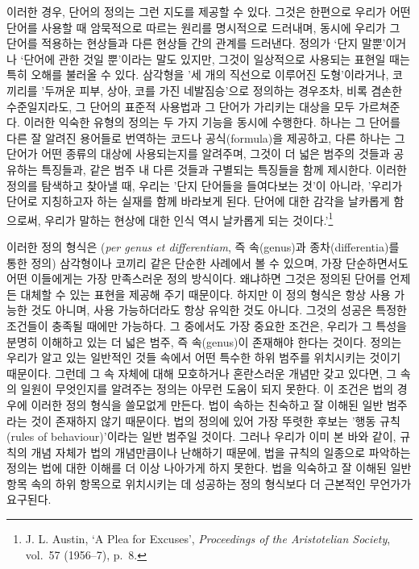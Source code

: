 \documentclass[12pt, oneside]{book}  %
\begin{document}
이러한 경우, 단어의 정의는 그런 지도를 제공할 수 있다. 그것은 한편으로
우리가 어떤 단어를 사용할 때 암묵적으로 따르는 원리를 명시적으로
드러내며, 동시에 우리가 그 단어를 적용하는 현상들과 다른 현상들 간의
관계를 드러낸다. 정의가 `단지 말뿐'이거나 `단어에 관한 것일 뿐'이라는
말도 있지만, 그것이 일상적으로 사용되는 표현일 때는 특히 오해를 불러올
수 있다. 삼각형을 '세 개의 직선으로 이루어진 도형'이라거나, 코끼리를
'두꺼운 피부, 상아, 코를 가진 네발짐승'으로 정의하는 경우조차, 비록
겸손한 수준일지라도, 그 단어의 표준적 사용법과 그 단어가 가리키는 대상을
모두 가르쳐준다. 이러한 익숙한 유형의 정의는 두 가지 기능을 동시에
수행한다. 하나는 그 단어를 다른 잘 알려진 용어들로 번역하는 코드나
공식(formula)을 제공하고, 다른 하나는 그 단어가 어떤 종류의 대상에
사용되는지를 알려주며, 그것이 더 넓은 범주의 것들과 공유하는 특징들과,
같은 범주 내 다른 것들과 구별되는 특징들을 함께 제시한다. 이러한 정의를
탐색하고 찾아낼 때, 우리는 '단지 단어들을 들여다보는 것'이 아니라,
'우리가 단어로 지칭하고자 하는 실재를 함께 바라보게 된다. 단어에 대한
감각을 날카롭게 함으로써, 우리가 말하는 현상에 대한 인식 역시 날카롭게
되는 것이다.'\footnote{J. L. Austin, `A Plea for Excuses',
  \emph{Proceedings of the Aristotelian Society}, vol.~57 (1956--7),
  p.~8.}

이러한 정의 형식은 (\emph{per genus et differentiam}, 즉 속(genus)과
종차(differentia)를 통한 정의) 삼각형이나 코끼리 같은 단순한 사례에서 볼
수 있으며, 가장 단순하면서도 어떤 이들에게는 가장 만족스러운 정의
방식이다. 왜냐하면 그것은 정의된 단어를 언제든 대체할 수 있는 표현을
제공해 주기 때문이다. 하지만 이 정의 형식은 항상 사용 가능한 것도
아니며, 사용 가능하더라도 항상 유익한 것도 아니다. 그것의 성공은 특정한
조건들이 충족될 때에만 가능하다. 그 중에서도 가장 중요한 조건은, 우리가
그 특성을 분명히 이해하고 있는 더 넓은 범주, 즉 속(genus)이 존재해야
한다는 것이다. 정의는 우리가 알고 있는 일반적인 것들 속에서 어떤 특수한
하위 범주를 위치시키는 것이기 때문이다. 그런데 그 속 자체에 대해
모호하거나 혼란스러운 개념만 갖고 있다면, 그 속의 일원이 무엇인지를
알려주는 정의는 아무런 도움이 되지 못한다. 이 조건은 법의 경우에 이러한
정의 형식을 쓸모없게 만든다. 법이 속하는 친숙하고 잘 이해된 일반
범주라는 것이 존재하지 않기 때문이다. 법의 정의에 있어 가장 뚜렷한
후보는 '행동 규칙(rules of behaviour)'이라는 일반 범주일 것이다. 그러나
우리가 이미 본 바와 같이, 규칙의 개념 자체가 법의 개념만큼이나 난해하기
때문에, 법을 규칙의 일종으로 파악하는 정의는 법에 대한 이해를 더 이상
나아가게 하지 못한다. 법을 익숙하고 잘 이해된 일반 항목 속의 하위
항목으로 위치시키는 데 성공하는 정의 형식보다 더 근본적인 무언가가
요구된다.
\end{document}
